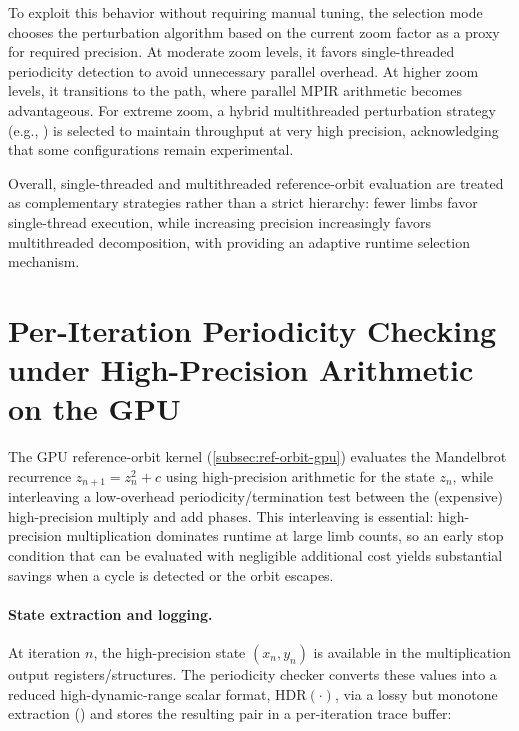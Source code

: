 To exploit this behavior without requiring manual tuning, the 
selection mode chooses the perturbation algorithm based on the current zoom
factor as a proxy for required precision.  At moderate zoom levels, it favors
single-threaded periodicity detection to avoid unnecessary parallel overhead.
At higher zoom levels, it transitions to the  path, where
parallel MPIR arithmetic becomes advantageous.  For extreme zoom, a hybrid
multithreaded perturbation strategy (e.g.,
) is selected to maintain throughput at
very high precision, acknowledging that some configurations remain
experimental.

Overall, single-threaded and multithreaded reference-orbit evaluation are
treated as complementary strategies rather than a strict hierarchy: fewer limbs
favor single-thread execution, while increasing precision increasingly favors
multithreaded decomposition, with  providing an adaptive runtime
selection mechanism.


\section{Per-Iteration Periodicity Checking under High-Precision Arithmetic on the GPU}
\label{sec:hp-periodicity}

The \FractalShark{} GPU reference-orbit kernel (\cref{subsec:ref-orbit-gpu}) evaluates the Mandelbrot recurrence
\(
z_{n+1} = z_n^2 + c
\)
using high-precision arithmetic for the state \(z_n\), while interleaving a
low-overhead periodicity/termination test between the (expensive) high-precision
multiply and add phases. This interleaving is essential: high-precision
multiplication dominates runtime at large limb counts, so an early stop
condition that can be evaluated with negligible additional cost yields
substantial savings when a cycle is detected or the orbit escapes.

\paragraph{State extraction and logging.}

At iteration \(n\), the high-precision state \((x_n, y_n)\) is available in the
multiplication output registers/structures. The periodicity checker converts
these values into a reduced high-dynamic-range scalar format,
\(\mathrm{HDR}(\cdot)\), via a lossy but monotone extraction
() and stores the resulting pair in a per-iteration trace
buffer:

